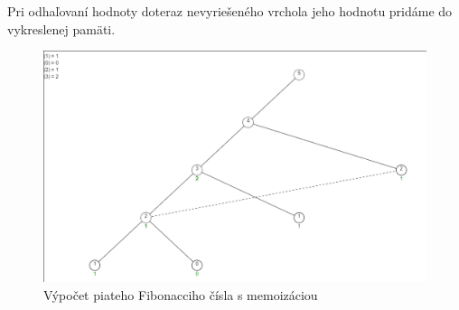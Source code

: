 Pri odhaľovaní hodnoty doteraz nevyriešeného vrchola jeho hodnotu pridáme do vykreslenej pamäti.
\begin{figure}[h]
\includegraphics[width=\linewidth]{images/memoizacia.png}
\caption{Výpočet piateho Fibonacciho čísla s memoizáciou}
\label{obr:memo}
\end{figure}

